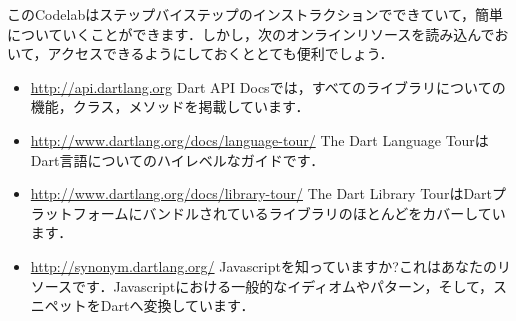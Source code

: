 このCodelabはステップバイステップのインストラクションでできていて，簡単についていくことができます．しかし，次のオンラインリソースを読み込んでおいて，アクセスできるようにしておくととても便利でしょう．

\begin{itemize}
\item \url{http://api.dartlang.org} Dart API Docsでは，すべてのライブラリについての機能，クラス，メソッドを掲載しています．
\item \url{http://www.dartlang.org/docs/language-tour/} The Dart Language TourはDart言語についてのハイレベルなガイドです．
\item \url{http://www.dartlang.org/docs/library-tour/} The Dart Library TourはDartプラットフォームにバンドルされているライブラリのほとんどをカバーしています．
\item \url{http://synonym.dartlang.org/} Javascriptを知っていますか?これはあなたのリソースです．Javascriptにおける一般的なイディオムやパターン，そして，スニペットをDartへ変換しています．
\end{itemize}
